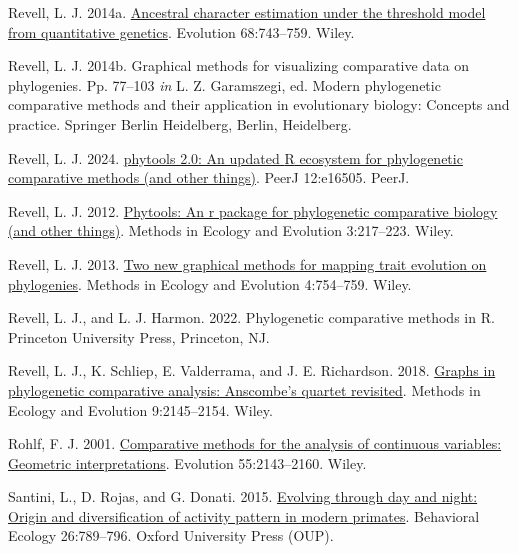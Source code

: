 \documentclass{article}
\newlength{\cslhangindent}
\newenvironment{CSLReferences}[2] %
 {\begin{list}{}{%
  \setlength{\itemindent}{0pt}
  \setlength{\leftmargin}{0pt}
  \setlength{\parsep}{0pt}
  \ifodd #1
   \setlength{\leftmargin}{\cslhangindent}
   \setlength{\itemindent}{-1\cslhangindent}
  \fi
  \setlength{\itemsep}{#2\baselineskip}}}
 {\end{list}}
\begin{document}
\begin{CSLReferences}{1}{0}
Revell, L. J. 2014a. \href{https://doi.org/10.1111/evo.12300}{Ancestral character estimation under the threshold model from quantitative genetics}. Evolution 68:743--759. Wiley.

Revell, L. J. 2014b. Graphical methods for visualizing comparative data on phylogenies. Pp. 77--103 \emph{in} L. Z. Garamszegi, ed. Modern phylogenetic comparative methods and their application in evolutionary biology: Concepts and practice. Springer Berlin Heidelberg, Berlin, Heidelberg.

Revell, L. J. 2024. \href{https://doi.org/10.7717/peerj.16505}{{p}hytools 2.0: An updated {R} ecosystem for phylogenetic comparative methods (and other things)}. PeerJ 12:e16505. PeerJ.

Revell, L. J. 2012. \href{https://doi.org/10.1111/j.2041-210x.2011.00169.x}{Phytools: An r package for phylogenetic comparative biology (and other things)}. Methods in Ecology and Evolution 3:217--223. Wiley.

Revell, L. J. 2013. \href{https://doi.org/10.1111/2041-210x.12066}{Two new graphical methods for mapping trait evolution on phylogenies}. Methods in Ecology and Evolution 4:754--759. Wiley.

Revell, L. J., and L. J. Harmon. 2022. Phylogenetic comparative methods in {R}. Princeton University Press, Princeton, NJ.

Revell, L. J., K. Schliep, E. Valderrama, and J. E. Richardson. 2018. \href{https://doi.org/10.1111/2041-210x.13067}{Graphs in phylogenetic comparative analysis: Anscombe's quartet revisited}. Methods in Ecology and Evolution 9:2145--2154. Wiley.

Rohlf, F. J. 2001. \href{https://doi.org/10.1111/j.0014-3820.2001.tb00731.x}{Comparative methods for the analysis of continuous variables: Geometric interpretations}. Evolution 55:2143--2160. Wiley.

Santini, L., D. Rojas, and G. Donati. 2015. \href{https://doi.org/10.1093/beheco/arv012}{Evolving through day and night: Origin and diversification of activity pattern in modern primates}. Behavioral Ecology 26:789--796. Oxford University Press (OUP).


\end{CSLReferences}
\end{document}
